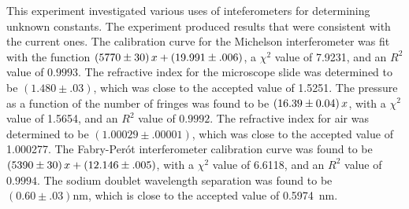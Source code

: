 
\usepackage{tikz}
\usetikzlibrary{optics}

\physics

\begin{paperabs}
	
	This experiment investigated various uses of inteferometers for determining unknown constants. The experiment produced results that were consistent with the current ones. The calibration curve for the Michelson interferometer was fit with the function \( \left(5770 \pm 30 \right) x + \left(19.991 \pm .006\right) \), a $\chi^2$ value of 7.9231, and an \( R^2 \) value of \( 0.9993 \).
	The refractive index for the microscope slide was determined to be $(1.480\pm.03)$, which was close to the accepted value of 1.5251.
	The pressure as a function of the number of fringes was found to be \( \left(16.39 \pm 0.04\right) x \), with a $\chi^2$ value of 1.5654, and an \( R^2 \) value of \( 0.9992 \).
	The refractive index for air was determined to be $(1.00029\pm.00001)$, which was close to the accepted value of 1.000277.
	The Fabry-Per\'ot interferometer calibration curve was found to be \( \left(5390 \pm 30\right) x + \left(12.146 \pm .005 \right) \), with a $\chi^2$ value of 6.6118, and an \( R^2 \) value of \( 0.9994 \).
	The sodium doublet wavelength separation was found to be $(0.60\pm.03)\si{\nano\meter}$, which is close to the accepted value of \SI{0.5974}{\nano\meter}.
	
\end{paperabs}

